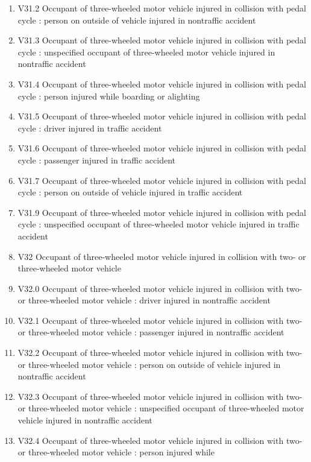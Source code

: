 \documentclass[
]{scrartcl}
\begin{document}
\begin{itemize}
\begin{enumerate}
  \item
    V31.2 Occupant of three-wheeled motor vehicle injured in collision
    with pedal cycle : person on outside of vehicle injured in
    nontraffic accident
  \item
    V31.3 Occupant of three-wheeled motor vehicle injured in collision
    with pedal cycle : unspecified occupant of three-wheeled motor
    vehicle injured in nontraffic accident
  \item
    V31.4 Occupant of three-wheeled motor vehicle injured in collision
    with pedal cycle : person injured while boarding or alighting
  \item
    V31.5 Occupant of three-wheeled motor vehicle injured in collision
    with pedal cycle : driver injured in traffic accident
  \item
    V31.6 Occupant of three-wheeled motor vehicle injured in collision
    with pedal cycle : passenger injured in traffic accident
  \item
    V31.7 Occupant of three-wheeled motor vehicle injured in collision
    with pedal cycle : person on outside of vehicle injured in traffic
    accident
  \item
    V31.9 Occupant of three-wheeled motor vehicle injured in collision
    with pedal cycle : unspecified occupant of three-wheeled motor
    vehicle injured in traffic accident
  \item
    V32 Occupant of three-wheeled motor vehicle injured in collision
    with two- or three-wheeled motor vehicle
  \item
    V32.0 Occupant of three-wheeled motor vehicle injured in collision
    with two- or three-wheeled motor vehicle : driver injured in
    nontraffic accident
  \item
    V32.1 Occupant of three-wheeled motor vehicle injured in collision
    with two- or three-wheeled motor vehicle : passenger injured in
    nontraffic accident
  \item
    V32.2 Occupant of three-wheeled motor vehicle injured in collision
    with two- or three-wheeled motor vehicle : person on outside of
    vehicle injured in nontraffic accident
  \item
    V32.3 Occupant of three-wheeled motor vehicle injured in collision
    with two- or three-wheeled motor vehicle : unspecified occupant of
    three-wheeled motor vehicle injured in nontraffic accident
  \item
    V32.4 Occupant of three-wheeled motor vehicle injured in collision
    with two- or three-wheeled motor vehicle : person injured while

\end{enumerate}
\end{itemize}
\end{document}
